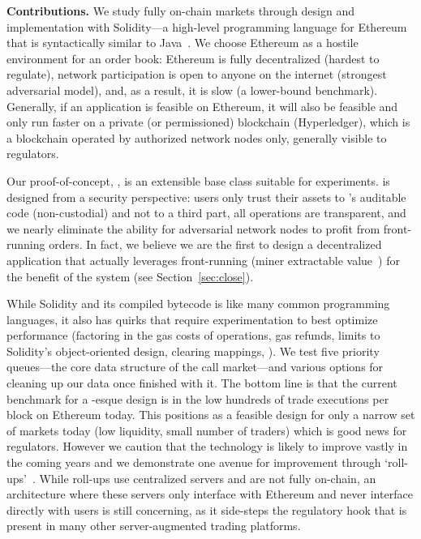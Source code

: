 \textbf{Contributions.} We study fully on-chain markets through design and implementation with Solidity---a high-level programming language for Ethereum that is syntactically similar to Java~\cite{Ethereum41:online}. We choose Ethereum as a hostile environment for an order book: Ethereum is fully decentralized (hardest to regulate), network participation is open to anyone on the internet (strongest adversarial model), and, as a result, it is slow (a lower-bound benchmark). Generally, if an application is feasible on Ethereum, it will also be feasible and only run faster on a private (or permissioned) blockchain (\eg Hyperledger), which is a blockchain operated by authorized network nodes only, generally visible to regulators. 

Our proof-of-concept, \cm, is an extensible base class suitable for experiments. \cm is designed from a security perspective: users only trust their assets to \cm's auditable code (non-custodial) and not to a third part, all operations are transparent, and we nearly eliminate the ability for adversarial network nodes to profit from front-running orders. In fact, we believe we are the first to design a decentralized application that actually leverages front-running (\ie miner extractable value~\cite{daian2019flash}) for the benefit of the system (see Section~\ref{sec:close}).  

While Solidity and its compiled bytecode is like many common programming languages, it also has quirks that require experimentation to best optimize performance (\eg factoring in the gas costs of operations, gas refunds, limits to Solidity's object-oriented design, clearing mappings, \etc). We test five priority queues---the core data structure of the call market---and various options for cleaning up our data once finished with it. The bottom line is that the current benchmark for a \cm-esque design is in the low hundreds of trade executions per block on Ethereum today. This positions \cm as a feasible design for only a narrow set of markets today (low liquidity, small number of traders) which is good news for regulators. However we caution that the technology is likely to improve vastly in the coming years and we demonstrate one avenue for improvement through `roll-ups'~\cite{kalodner2018arbitrum}. While roll-ups use centralized servers and are not fully on-chain, an architecture where these servers only interface with Ethereum and never interface directly with users is still concerning, as it side-steps the regulatory hook that is present in many other server-augmented trading platforms.

